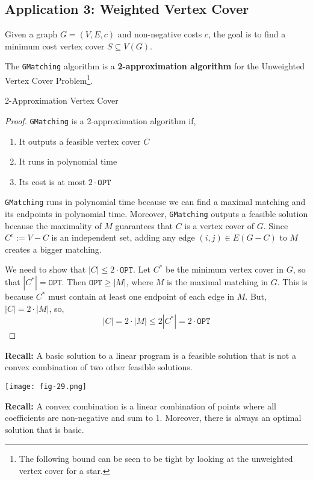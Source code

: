 \subsection{Application 3: Weighted Vertex Cover}
Given a graph $G = (V, E, c)$ and non-negative costs $c$, the goal is to find a minimum cost vertex cover $S \subseteq V(G)$.

\begin{thm}
	The \texttt{GMatching} algorithm is a \textbf{2-approximation algorithm} for the Unweighted Vertex Cover Problem\footnote{The following bound can be seen to be tight by looking at the unweighted vertex cover for a star.}.
	\begin{algorithm}
	  \caption{2-Approximation Vertex Cover}\label{vertcov}
	\end{algorithm}
\end{thm}

\begin{proof}
	\texttt{GMatching} is a 2-approximation algorithm if,
	\begin{enumerate}
		\item It outputs a feasible vertex cover $C$
		\item It runs in polynomial time
		\item Its cost is at most $2 \cdot \texttt{OPT}$
	\end{enumerate}

	\noindent \texttt{GMatching} runs in polynomial time because we can find a maximal matching and its endpoints in polynomial time. Moreover, \texttt{GMatching} outputs a feasible solution because the  maximality of $M$ guarantees that $C$ is a vertex cover of $G$. Since $C^c := V - C$ is an independent set, adding any edge $(i,j) \in E(G - C)$ to $M$ creates a bigger matching.

	We need to show that $|C| \leq 2 \cdot \texttt{OPT}$. Let $C^*$ be the minimum vertex cover in $G$, so that $|C^*| = \texttt{OPT}$. Then $\texttt{OPT} \geq |M|$, where $M$ is the maximal matching in $G$. This is because $C^*$ must contain at least one endpoint of each edge in $M$. But, $|C| = 2 \cdot |M|$, so,
	\[|C| = 2 \cdot |M| \leq 2 |C^*| = 2 \cdot \texttt{OPT}\]
\end{proof}

\begin{marginfigure}
	\textbf{Recall: } A basic solution to a linear program is a feasible solution that is not a convex combination of two other feasible solutions.

	\begin{center}
		\texttt{[image: fig-29.png]}
	\end{center}
		
	\noindent \textbf{Recall: } A convex combination is a linear combination of points where all coefficients are non-negative and sum to 1. Moreover, there is always an optimal solution that is basic.
\end{marginfigure}

